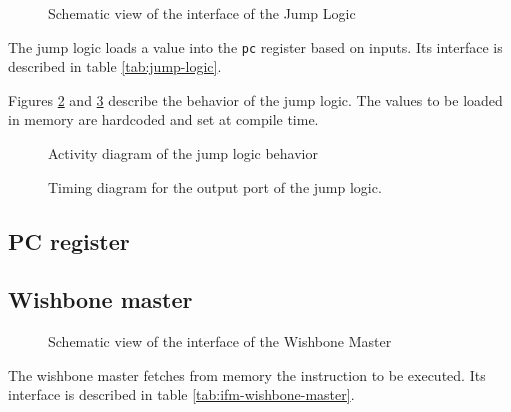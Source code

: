 \begin{figure}[H]
    \centering
    
    \caption{Schematic view of the interface of the Jump Logic}
    \label{fig:jump-logic}
\end{figure}

\begin{content}
  The jump logic loads a value into the \texttt{pc} register based on inputs. Its interface is described in table \ref{tab:jump-logic}.
\end{content}



\begin{content}
\end{content}

\begin{content}
  Figures \ref{fig:jump-logic-behavior} and \ref{fig:jump-logic-output} describe the behavior of the jump logic. The values to be loaded in memory are hardcoded and set at compile time.
\end{content}

\begin{figure}[H]
    \centering
    
    \caption{Activity diagram of the jump logic behavior}
    \label{fig:jump-logic-behavior}
\end{figure}

\begin{figure}[H]
    \centering
    
    \caption{Timing diagram for the output port of the jump logic.}
    \label{fig:jump-logic-output}
\end{figure}

\subsection{PC register}

\subsection{Wishbone master}

\begin{figure}[H]
    \centering
    
    \caption{Schematic view of the interface of the Wishbone Master}
    \label{fig:ifm-wishbone-master}
\end{figure}

\begin{content}
  The wishbone master fetches from memory the instruction to be executed. Its interface is described in table \ref{tab:ifm-wishbone-master}.
\end{content}

